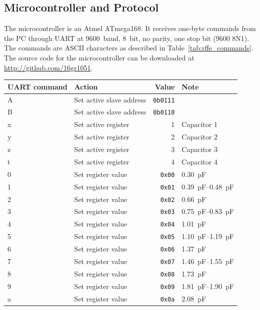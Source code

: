 \subsection{Microcontroller and Protocol}
The microcontroller is an Atmel ATmega168. It receives one-byte commands from the PC through UART at \SI{9600}{baud}, \SI{8}{bit}, no parity, one stop bit (9600 8N1). The commands are ASCII characters as described in Table~\ref{tab:rffe_commands}. The source code for the microcontroller can be downloaded at \url{http://github.com/16gr1051}.

\begin{table}[htbp]
    \centering
    \begin{tabular}{|l|l|r|l|}
        \hline
        UART command & Action & Value & Note \\
        \hline
        A & Set active slave address & \texttt{0b0111} & \\
        B & Set active slave address & \texttt{0b0110} & \\
        \hline
        x & Set active register & 1 & Capacitor 1\\
        y & Set active register & 2 & Capacitor 2\\
        z & Set active register & 3 & Capacitor 3\\
        t & Set active register & 4 & Capacitor 4\\
        \hline
        0 & Set register value & \texttt{0x00} & \SI{0.30}{pF}\\
        1 & Set register value & \texttt{0x01} & \SIrange{0.39}{0.48}{pF}\\
        2 & Set register value & \texttt{0x02} & \SI{0.66}{pF}\\
        3 & Set register value & \texttt{0x03} & \SIrange{0.75}{0.83}{pF}\\
        4 & Set register value & \texttt{0x04} & \SI{1.01}{pF}\\
        5 & Set register value & \texttt{0x05} & \SIrange{1.10}{1.19}{pF}\\
        6 & Set register value & \texttt{0x06} & \SI{1.37}{pF}\\
        7 & Set register value & \texttt{0x07} & \SIrange{1.46}{1.55}{pF}\\
        8 & Set register value & \texttt{0x08} & \SI{1.73}{pF}\\
        9 & Set register value & \texttt{0x09} & \SIrange{1.81}{1.90}{pF}\\
        a & Set register value & \texttt{0x0a} & \SI{2.08}{pF}\\

\end{tabular}
\end{table}
